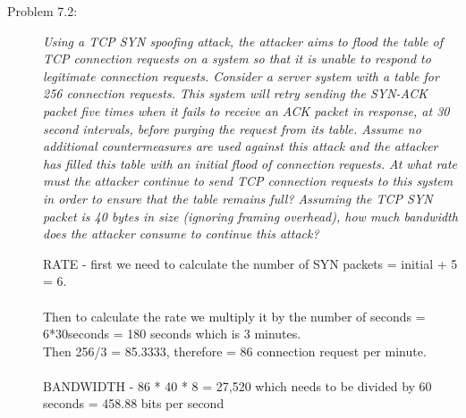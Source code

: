 \documentclass[12pt]{article}
\begin{document}
\begin{description}
\item[Problem 7.2:] {\color{grey}\textit{Using a TCP SYN spoofing attack, the attacker aims to flood the table of TCP connection requests on a system so that it is unable to respond to legitimate connection requests. Consider a server system with a table for 256 connection requests. This system will retry sending the SYN-ACK packet five times when it fails to receive an ACK packet in response, at 30 second intervals, before purging the request from its table. Assume no additional countermeasures are used against this attack and the attacker has filled this table with an initial flood of connection requests. At what rate must the attacker continue to send TCP connection requests to this system in order to ensure that the table remains full? Assuming the TCP SYN packet is 40 bytes in size (ignoring framing overhead), how much bandwidth does the attacker consume to continue this attack?}} \par
RATE - first we need to calculate the number of SYN packets = initial + 5 = 6. \\\\Then to calculate the rate we multiply it by the number of seconds = 6*30seconds = 180 seconds which is 3 minutes.  \\ Then 256/3 = 85.3333, therefore = 86 connection request per minute. \\\\
BANDWIDTH -  86 * 40 * 8 = 27,520 which needs to be divided by 60 seconds = 458.88 bits per second\par


\end{description}
\end{document}
